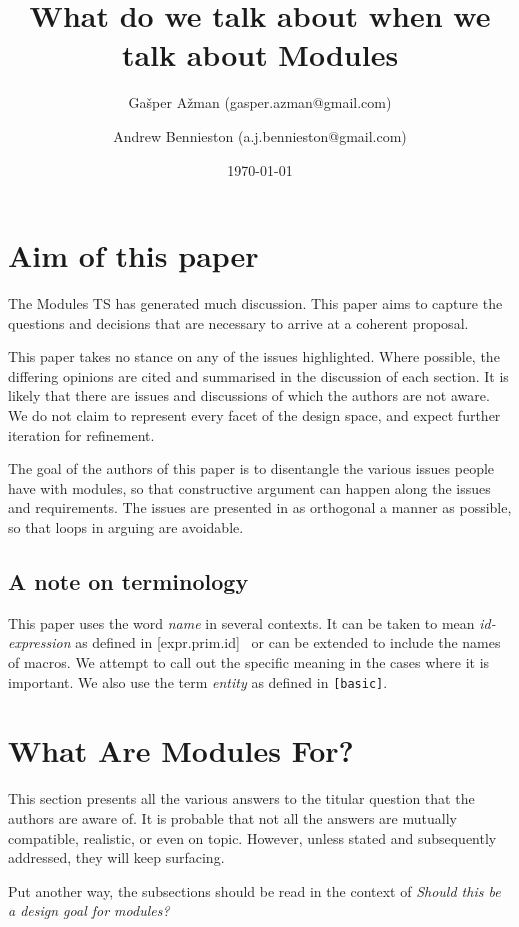 \documentclass[reqno]{article}
\title{What do we talk about when we talk about Modules}
\author{Gašper Ažman \small{(gasper.azman@gmail.com)}
\and Andrew Bennieston \small{(a.j.bennieston@gmail.com)}}
\date{\today}
\begin{document}
\maketitle
\section{Aim of this paper}

The Modules TS \citep{N4647} has generated much discussion. This paper aims to
capture the questions and decisions that are necessary to arrive at a coherent
proposal.

This paper takes no stance on any of the issues highlighted. Where possible,
the differing opinions are cited and summarised in the discussion of each
section. It is likely that there are issues and discussions of which the
authors are not aware. We do not claim to represent every facet of the design
space, and expect further iteration for refinement.

The goal of the authors of this paper is to disentangle the various issues
people have with modules, so that constructive argument can happen along the
issues and requirements. The issues are presented in as orthogonal a manner as
possible, so that loops in arguing are avoidable.

\subsection{A note on terminology}

This paper uses the word \emph{name} in several contexts. It can be taken to
mean \emph{id-expression} as defined in [expr.prim.id]~\citep{N4659} or can
be extended to include the names of macros. We attempt to call out the specific
meaning in the cases where it is important. We also use the term \emph{entity}
as defined in \texttt{[basic]}.~\citep{N4659}

\section{What Are Modules For?}

This section presents all the various answers to the titular question that the
authors are aware of. It is probable that not all the answers are mutually
compatible, realistic, or even on topic. However, unless stated and
subsequently addressed, they will keep surfacing.

Put another way, the subsections should be read in the context of \emph{Should
this be a design goal for modules?}
\end{document}

